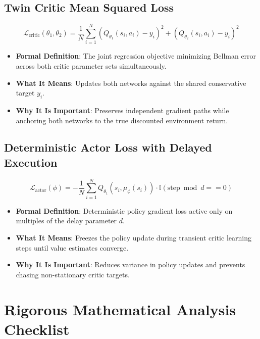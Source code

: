 \documentclass[11pt,a4paper]{article}
\theoremstyle{definition}
\begin{document}
\subsection{Twin Critic Mean Squared Loss}
{\boldmath
\begin{equation}
\mathcal{L}_{\text{critic}}(\theta_1, \theta_2) = \frac{1}{N}\sum_{i=1}^N \left( Q_{\theta_1}(s_i, a_i) - y_i \right)^2 + \left( Q_{\theta_2}(s_i, a_i) - y_i \right)^2
\end{equation}
}
\begin{itemize}
    \item \textbf{Formal Definition}: The joint regression objective minimizing Bellman error across both critic parameter sets simultaneously.
    \item \textbf{What It Means}: Updates both networks against the shared conservative target $y_i$.
    \item \textbf{Why It Is Important}: Preserves independent gradient paths while anchoring both networks to the true discounted environment return.
\end{itemize}

\subsection{Deterministic Actor Loss with Delayed Execution}
{\boldmath
\begin{equation}
\mathcal{L}_{\text{actor}}(\phi) = - \frac{1}{N}\sum_{i=1}^N Q_{\theta_1}(s_i, \mu_\phi(s_i)) \cdot \mathbb{I}(\text{step} \bmod d == 0)
\end{equation}
}
\begin{itemize}
    \item \textbf{Formal Definition}: Deterministic policy gradient loss active only on multiples of the delay parameter $d$.
    \item \textbf{What It Means}: Freezes the policy update during transient critic learning steps until value estimates converge.
    \item \textbf{Why It Is Important}: Reduces variance in policy updates and prevents chasing non-stationary critic targets.
\end{itemize}

\section{Rigorous Mathematical Analysis Checklist}
\end{document}
